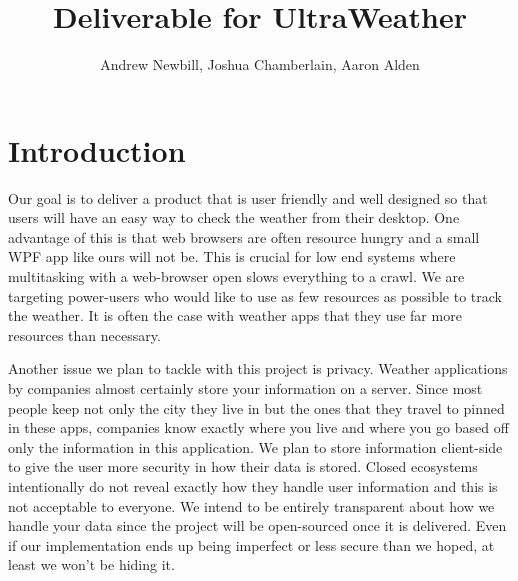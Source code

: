 \documentclass[10pt,conference,onecolumn,compsoc]{IEEEtran}
\begin{document}
\title{Deliverable for UltraWeather}
%
%


\author{Andrew Newbill, Joshua Chamberlain, Aaron Alden\\ %
}



\maketitle



\IEEEdisplaynontitleabstractindextext

\IEEEpeerreviewmaketitle



\section{Introduction}
\quad Our goal is to deliver a product that is user friendly and well designed so that users will have an easy way to check the weather from their desktop. One advantage of this is that web browsers are often resource hungry and a small WPF app like ours will not be. This is crucial for low end systems where multitasking with a web-browser open slows everything to a crawl. We are targeting power-users who would like to use as few resources as possible to track the weather. It is often the case with weather apps that they use far more resources than necessary.

\quad Another issue we plan to tackle with this project is privacy. Weather applications by companies almost certainly store your information on a server. Since most people keep not only the city they live in but the ones that they travel to pinned in these apps, companies know exactly where you live and where you go based off only  the information in this application. We plan to store information client-side to give the user more security in how their data is stored. Closed ecosystems  intentionally do not reveal exactly how they handle user information and this is not acceptable to everyone. We intend to be entirely transparent about how we handle your data since the project will be open-sourced once it is delivered. Even if our implementation ends up being imperfect or less secure than we hoped, at least we won't be hiding it.
\end{document}
